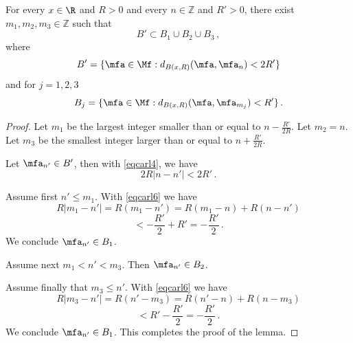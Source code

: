 \begin{lemma}
    \label{integer-ball-cover}
    \leanok
    For every $x\in \R$ and $R>0$ and every
    $n\in \mathbb{Z}$ and $R'>0$,
    there exist $m_1, m_2, m_3\in \mathbb{Z}$
    such that
    \begin{equation}\label{eqcarl5}
        B'\subset B_1\cup B_2\cup B_3\, ,
    \end{equation}
where
\begin{equation}
B'= \{ \mfa \in \Mf: d_{B(x,R)}(\mfa, \mfa_n)<2R'\}
\end{equation}
and for $j=1,2,3$
\begin{equation}
  B_j=
     \{ \mfa \in \Mf: d_{B(x,R)}(\mfa, \mfa_{m_j})<R'\}
     \, .
\end{equation}
\end{lemma}

\begin{proof}
\leanok
Let $m_1$ be the largest integer smaller than
or equal to
$n- \frac {R'} {2R}$.
Let $m_2=n$.
Let $m_3$ be the smallest integer larger than
or equal to $n+ \frac {R'} {2R}$.

Let $\mfa_{n'}\in B'$, then with \eqref{eqcarl4},
we have
\begin{equation}\label{eqcarl6}
    2R|n-n'|< 2R'\, .
\end{equation}

Assume first $n'\le m_1$. With \eqref{eqcarl6}
we have
\begin{equation*}
    R|m_1-n'|=R(m_1-n')=R(m_1-n)+R(n-n')
\end{equation*}
\begin{equation}
    < -\frac{R'}2+R'=-\frac{R'}2\, .
\end{equation}
We conclude $\mfa_{n'}\in B_1$.

Assume next $m_1<n'<m_3$. Then
$\mfa_{n'}\in B_2$.

Assume finally that $m_3\le n'$. With \eqref{eqcarl6}
we have
\begin{equation*}
    R|m_3-n'|=R(n'-m_3)=R(n'-n)+R(n-m_3)
\end{equation*}
\begin{equation}
    < R' -\frac{R'}2=-\frac{R'}2\, .
\end{equation}
We conclude $\mfa_{n'}\in B_1$.
This completes the proof of the lemma.
\end{proof}


